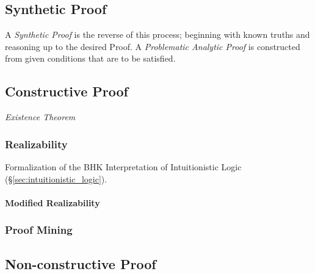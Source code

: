 \subsection{Synthetic Proof} \label{sec:synthetic_proof}

A \emph{Synthetic Proof} is the reverse of this process; beginning
with known truths and reasoning up to the desired Proof. A
\emph{Problematic Analytic Proof} is constructed from given conditions
that are to be satisfied.



\subsection{Constructive Proof}\label{sec:constructive_proof}

\emph{Existence Theorem}



\subsubsection{Realizability}\label{sec:realizability}

Formalization of the BHK Interpretation of Intuitionistic Logic
(\S\ref{sec:intuitionistic_logic}).



\paragraph{Modified Realizability}\label{sec:modified_realizability}



\subsubsection{Proof Mining}\label{sec:proof_mining}



\subsection{Non-constructive Proof}\label{sec:nonconstructive_proof}



